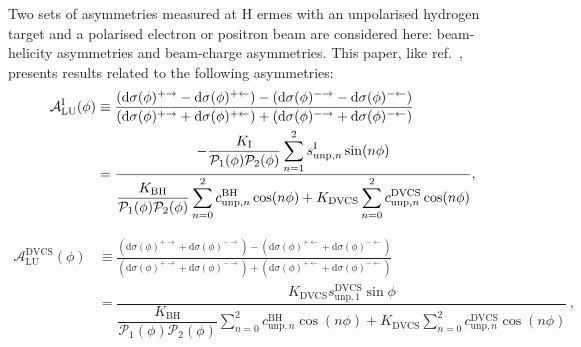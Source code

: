 Two sets of asymmetries measured at H{\sc
ermes} with an unpolarised hydrogen target and a polarised electron or positron
beam are considered here:
beam-helicity asymmetries and beam-charge asymmetries. This paper,
like ref.~\cite{Air09}, presents results related to the following asymmetries:
\begin{align}
\hspace{0.5cm}\mathcal{A}^{\textrm{I}}_{\textrm{LU}}(\phi) &\equiv
\frac{(\textrm{d}\sigma(\phi)^{+\rightarrow} -
\textrm{d}\sigma(\phi)^{+\leftarrow}) -
(\textrm{d}\sigma(\phi)^{-\rightarrow}
- \textrm{d}\sigma(\phi)^{-\leftarrow})}{(\textrm{d}\sigma(\phi)^{+\rightarrow}
+
\textrm{d}\sigma(\phi)^{+\leftarrow}) +
(\textrm{d}\sigma(\phi)^{-\rightarrow}
+ \textrm{d}\sigma(\phi)^{-\leftarrow})}&  \nonumber \\
&=\dfrac{-\dfrac{K_{\textrm{I}}}{\mathcal{P}_{1}(\phi)\mathcal{P}_{2}(\phi)}
\displaystyle\sum_{n=1}^2
s_{\textrm{unp},n}^{\textrm{I}}\sin(n\phi)}{\dfrac{K_{\textrm{BH}}}{\mathcal{P}_{1}
(\phi)\mathcal{P}_{
2}(\phi)}
\displaystyle\sum_{n=0}^2
c_{\textrm{unp},n}^{\textrm{BH}}\cos(n\phi) + 
K_{\textrm{DVCS}}\displaystyle\sum_{n=0}^2 c_{\textrm{unp},n}^{\textrm{DVCS}}\cos(n\phi)},& 
\label{e:alui}
\end{align}

\begin{align}
\mathcal{A}^{\textrm{DVCS}}_{\textrm{LU}}(\phi) &\equiv
\frac{(\textrm{d}\sigma(\phi)^{+\rightarrow} +
\textrm{d}\sigma(\phi)^{-\rightarrow}) -
(\textrm{d}\sigma(\phi)^{+\leftarrow} + 
\textrm{d}\sigma(\phi)^{-\leftarrow})}
{(\textrm{d}\sigma(\phi)^{+\rightarrow} +
\textrm{d}\sigma(\phi)^{-\rightarrow}) +
(\textrm{d}\sigma(\phi)^{+\leftarrow}
+ \textrm{d}\sigma(\phi)^{-\leftarrow})}& \nonumber \\[0.4cm]
&=\dfrac{ K_{\textrm{DVCS}} s_{\textrm{unp},1}^{\textrm{DVCS}}\sin\phi}{\dfrac{K_{\textrm{BH}}}{\mathcal{P}_{1}
(\phi)\mathcal{P}_{2}(\phi)}
\displaystyle\sum_{n=0}^2
c_{\textrm{unp},n}^{\textrm{BH}}\cos(n\phi) + 
K_{\textrm{DVCS}}\displaystyle\sum_{n=0}^2
c_{\textrm{unp},n}^{\textrm{DVCS}}\cos(n\phi)}\, , &
\label{e:aludvcs}
\end{align}

